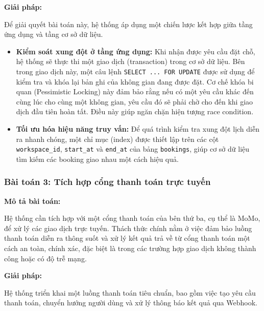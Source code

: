 \textbf{Giải pháp:}

Để giải quyết bài toán này, hệ thống áp dụng một chiến lược kết hợp giữa tầng ứng dụng và tầng cơ sở dữ liệu.

\begin{itemize}
    \item \textbf{Kiểm soát xung đột ở tầng ứng dụng:} Khi nhận được yêu cầu đặt chỗ, hệ thống sẽ thực thi một giao dịch (transaction) trong cơ sở dữ liệu. Bên trong giao dịch này, một câu lệnh \texttt{SELECT ... FOR UPDATE} được sử dụng để kiểm tra và khóa lại bản ghi của không gian đang được đặt. Cơ chế khóa bi quan (Pessimistic Locking) này đảm bảo rằng nếu có một yêu cầu khác đến cùng lúc cho cùng một không gian, yêu cầu đó sẽ phải chờ cho đến khi giao dịch đầu tiên hoàn tất. Điều này giúp ngăn chặn hiện tượng race condition.
    \item \textbf{Tối ưu hóa hiệu năng truy vấn:} Để quá trình kiểm tra xung đột lịch diễn ra nhanh chóng, một chỉ mục (index) được thiết lập trên các cột \texttt{workspace\_id}, \texttt{start\_at} và \texttt{end\_at} của bảng \texttt{bookings}, giúp cơ sở dữ liệu tìm kiếm các booking giao nhau một cách hiệu quả.
\end{itemize}

\subsubsection{Bài toán 3: Tích hợp cổng thanh toán trực tuyến}

\textbf{Mô tả bài toán:}

Hệ thống cần tích hợp với một cổng thanh toán của bên thứ ba, cụ thể là MoMo, để xử lý các giao dịch trực tuyến. Thách thức chính nằm ở việc đảm bảo luồng thanh toán diễn ra thông suốt và xử lý kết quả trả về từ cổng thanh toán một cách an toàn, chính xác, đặc biệt là trong các trường hợp giao dịch không thành công hoặc có độ trễ mạng.

\textbf{Giải pháp:}

Hệ thống triển khai một luồng thanh toán tiêu chuẩn, bao gồm việc tạo yêu cầu thanh toán, chuyển hướng người dùng và xử lý thông báo kết quả qua Webhook.

